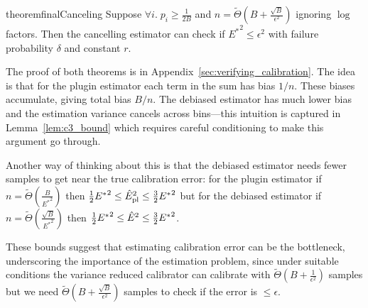 \begin{restatable}{theorem}{finalCanceling}
\label{thm:final-ours}
Suppose $\forall i.\;p_i \geq \frac{1}{2B}$ and $n = \widetilde{\Theta}(B+\frac{\sqrt{B}}{\epsilon^2})$ ignoring $\log$ factors. Then the cancelling estimator can check if ${E^*}^2 \leq \epsilon^2$ with failure probability $\delta$ and constant $r$. 
\end{restatable}

The proof of both theorems is in Appendix~\ref{sec:verifying_calibration}. The idea is that for the plugin estimator each term in the sum has bias $1/n$. These biases accumulate, giving total bias $B/n$. The debiased estimator has much lower bias and the estimation variance cancels across bins---this intuition is captured in Lemma~\ref{lem:c3_bound} which requires careful conditioning to make this argument go through.

Another way of thinking about this is that the debiased estimator needs fewer samples to get near the true calibration error: for the plugin estimator if $n = \widetilde{\Theta}(\frac{B}{{E^*}^2})$ then $\frac{1}{2} {E^*}^2 \leq \hat{E}_{\textup{pl}}^2{} \leq \frac{3}{2} {E^*}^2$ but for the debiased estimator if $n = \widetilde{\Theta}(\frac{\sqrt{B}}{{E^*}^2})$ then $\frac{1}{2} {E^*}^2 \leq \hat{E}^2{} \leq \frac{3}{2}{E^*}^2$.

These bounds suggest that estimating calibration error can be the bottleneck, underscoring the importance of the estimation problem, since under suitable conditions the variance reduced calibrator can calibrate with $\widetilde{\Theta}(B + \frac{1}{\epsilon^2})$ samples but we need $\widetilde{\Theta}(B + \frac{\sqrt{B}}{\epsilon^2})$ samples to check if the error is $\leq \epsilon$.



